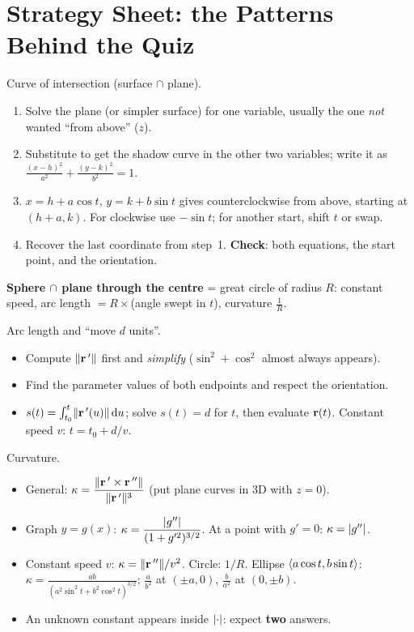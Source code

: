 \section{Strategy Sheet: the Patterns Behind the Quiz}\label{ch:patterns}

\begin{strategy}{Curve of intersection (surface $\cap$ plane).}
\begin{enumerate}
\item Solve the plane (or simpler surface) for one variable, usually the one
      \emph{not} wanted ``from above'' ($z$).
\item Substitute to get the shadow curve in the other two variables; write it as
      $\frac{(x-h)^2}{a^2}+\frac{(y-k)^2}{b^2}=1$.
\item $x=h+a\cos t$, $y=k+b\sin t$ gives counterclockwise from above, starting at
      $(h+a,k)$. For clockwise use $-\sin t$; for another start, shift $t$ or swap.
\item Recover the last coordinate from step~1. \textbf{Check}: both equations, the
      start point, and the orientation.
\end{enumerate}
\textbf{Sphere $\cap$ plane through the centre} = great circle of radius $R$:
constant speed, arc length $=R\times$(angle swept in $t$), curvature $\frac1R$.
\end{strategy}

\begin{strategy}{Arc length and ``move $d$ units''.}
\begin{itemize}
\item Compute $\lVert\mathbf{r}\,'\rVert$ first and \emph{simplify} ($\sin^2+\cos^2$ almost always appears).
\item Find the parameter values of both endpoints and respect the orientation.
\item $s(t)=\int_{t_0}^t\lVert\mathbf{r}\,'(u)\rVert\,\mathrm{d} u$; solve $s(t)=d$ for $t$, then evaluate $\mathbf{r}(t)$.
      Constant speed $v$: $t=t_0+d/v$.
\end{itemize}
\end{strategy}

\begin{strategy}{Curvature.}
\begin{itemize}
\item General: $\kappa=\dfrac{\lVert\mathbf{r}\,'\times\mathbf{r}\,''\rVert}{\lVert\mathbf{r}\,'\rVert^3}$ (put plane curves in 3D with $z=0$).
\item Graph $y=g(x)$: $\kappa=\dfrac{\lvert g''\rvert}{(1+g'^2)^{3/2}}$. At a point with $g'=0$: $\kappa=\lvert g''\rvert$.
\item Constant speed $v$: $\kappa=\lVert\mathbf{r}\,''\rVert/v^2$. Circle: $1/R$. Ellipse $\left\langle a\cos t,b\sin t \right\rangle$:
      $\kappa=\frac{ab}{(a^2\sin^2t+b^2\cos^2t)^{3/2}}$; $\frac{a}{b^2}$ at $(\pm a,0)$, $\frac{b}{a^2}$ at $(0,\pm b)$.
\item An unknown constant appears inside $\lvert\cdot\rvert$: expect \textbf{two} answers.
\end{itemize}
\end{strategy}


